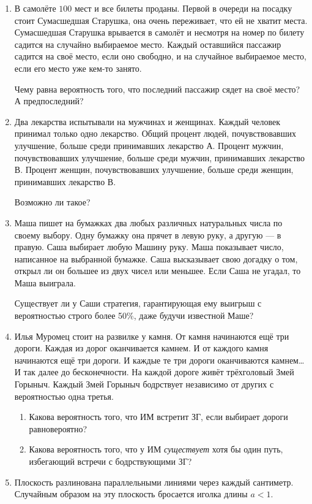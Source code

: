 \documentclass[12pt]{article}
\theoremstyle{definition}
\begin{document}
\begin{enumerate}
  \item В самолёте $100$ мест и все билеты проданы.
  Первой в очереди на посадку стоит Сумасшедшая Старушка,
  она очень переживает, что ей не хватит места.
  Сумасшедшая Старушка врывается в самолёт
  и несмотря на номер по билету садится на случайно выбираемое место.
  Каждый оставшийся пассажир садится на своё место, если оно свободно,
  и на случайное выбираемое место, если его место уже кем-то занято.

  Чему равна вероятность того, что последний пассажир сядет на своё место? А предпоследний?
\item  Два лекарства испытывали на мужчинах и женщинах. Каждый
человек принимал только одно лекарство. Общий процент людей,
почувствовавших улучшение, больше среди принимавших лекарство А.
Процент мужчин, почувствовавших улучшение, больше среди мужчин, принимавших лекарство В.
Процент женщин, почувствовавших улучшение, больше среди женщин, принимавших лекарство В.

Возможно ли такое?
\item Маша пишет на бумажках два любых различных натуральных числа по своему выбору.
Одну бумажку она прячет в левую руку, а другую — в правую.
Саша выбирает любую Машину руку. Маша показывает число, написанное на выбранной бумажке.
Саша высказывает свою догадку о том, открыл ли он большее из двух чисел или меньшее.
Если Саша не угадал, то Маша выиграла.

Существует ли у Саши стратегия,
гарантирующая ему выигрыш с вероятностью строго более 50\%, даже будучи известной Маше?

\item Илья Муромец стоит на развилке у камня. От камня начинаются
ещё три дороги. Каждая из дорог оканчивается камнем.
И от каждого камня начинаются ещё три дороги. И каждые те три
дороги оканчиваются камнем\ldots И так далее до бесконечности. На
каждой дороге живёт трёхголовый Змей Горыныч. Каждый Змей
Горыныч бодрствует независимо от других с вероятностью одна третья. 

\begin{enumerate}
  \item Какова вероятность того, что ИМ встретит ЗГ, если выбирает дороги равновероятно?
  \item Какова вероятность того, что у ИМ \textit{существует} хотя бы один путь, избегающий встречи с бодрствующими ЗГ?
\end{enumerate}
\item Плоскость разлинована параллельными линиями через каждый сантиметр.
Случайным образом на эту плоскость бросается иголка длины $a<1$.


\end{enumerate}
\end{document}
